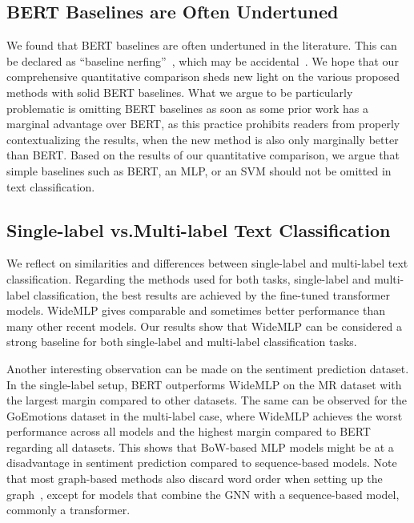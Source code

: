 \documentclass[acmsmall,nonacm]{acmart}
\newcommand{\mlp}{WideMLP\xspace}
\begin{document}
\subsection{BERT Baselines are Often Undertuned}

We found that BERT baselines are often undertuned in the literature. This can be declared as ``baseline nerfing''~, which may be accidental~\cite{leech2024questionablepracticesmachinelearning}. 
We hope that our comprehensive quantitative comparison sheds new light on the various proposed methods with solid BERT baselines. What we argue to be particularly problematic is omitting BERT baselines as soon as some prior work has a marginal advantage over BERT, as this practice prohibits readers from properly contextualizing the results, \eg when the new method is also only marginally better than BERT. Based on the results of our quantitative comparison, we argue that simple baselines such as BERT, an MLP, or an SVM should not be omitted in text classification.

\subsection{Single-label vs.\@ Multi-label Text Classification}

We reflect on similarities and differences between single-label and multi-label text classification.
Regarding the methods used for both tasks, \ie single-label and multi-label classification, the best results are achieved by the fine-tuned transformer models.
\mlp gives comparable and sometimes better performance than many other recent models. Our results show that \mlp can be considered a strong baseline for both single-label and multi-label classification tasks.

Another interesting observation can be made on the sentiment prediction dataset. 
In the single-label setup, BERT outperforms \mlp on the MR dataset with the largest margin compared to other datasets. 
The same can be observed for the GoEmotions dataset in the multi-label case, where \mlp achieves the worst performance across all models and the highest margin compared to BERT regarding all datasets. 
This shows that BoW-based MLP models might be at a disadvantage in sentiment prediction compared to sequence-based models.
Note that most graph-based methods also discard word order when setting up the graph~\cite{galkescherp-acl2022}, except for models that combine the GNN with a sequence-based model, \ie commonly a transformer. 
\end{document}
